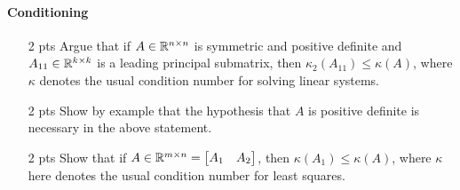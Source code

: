 \documentclass[12pt, leqno]{article} %
\begin{document}
\paragraph*{Conditioning}
\begin{itemize}
\item[2 pts]
  Argue that if $A \in \mathbb{R}^{n \times n}$ is symmetric and positive definite and
  $A_{11} \in \mathbb{R}^{k \times k}$ is a leading principal submatrix,
  then $\kappa_2(A_{11}) \leq \kappa(A)$, where $\kappa$ denotes
  the usual condition number for solving linear systems.
\item[2 pts]
  Show by example that the hypothesis that $A$ is positive definite
  is necessary in the above statement.
\item[2 pts]
  Show that if
  $A \in \mathbb{R}^{m \times n} = \begin{bmatrix} A_1 & A_2 \end{bmatrix}$,
  then $\kappa(A_1) \leq \kappa(A)$, where $\kappa$ here denotes the
  usual condition number for least squares.
\end{itemize}

\end{document}

